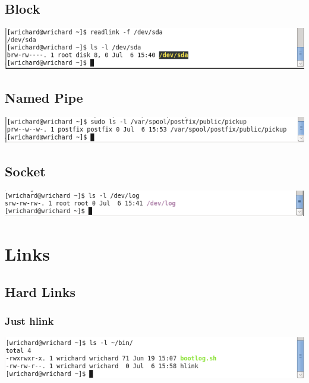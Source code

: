 \documentclass[a4paper,10pt]{article}
\begin{document}
\subsection{Block}
  \begin{center}
  \includegraphics[width=\linewidth]{./block.png}
  \end{center}

\subsection{Named Pipe}
  \begin{center}
  \includegraphics[width=\linewidth]{./pipe.png}
  \end{center}

\subsection{Socket}
  \begin{center}
  \includegraphics[width=\linewidth]{./socket.png}
  \end{center}

\section{Links}
\subsection{Hard Links}
\subsubsection{Just hlink}
  \begin{center}
  \includegraphics[width=\linewidth]{./hlink1.png}
  \end{center}
\end{document}
